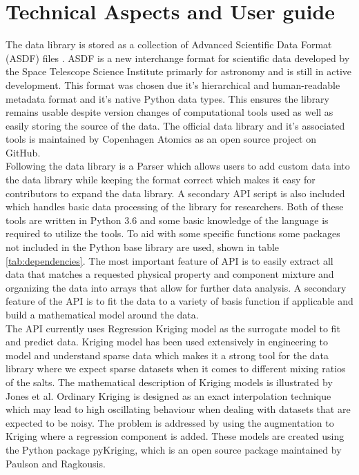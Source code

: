 \section{Technical Aspects and User guide}
The data library is stored as a collection of Advanced Scientific Data Format (ASDF) files \cite{greenfield2015a}. ASDF is a new interchange format for scientific data developed by the Space Telescope Science Institute primarly for astronomy and is still in active development. This format was chosen due it's hierarchical and human-readable metadata format and it's native Python data types. This ensures the library remains usable despite version changes of computational tools used as well as easily storing the source of the data. The official data library and it's associated tools is maintained by Copenhagen Atomics as an open source project on GitHub.\\ \newline
Following the data library is a Parser which allows users to add custom data into the data library while keeping the format correct which makes it easy for contributors to expand the data library. A secondary API script is also included which handles basic data processing of the library for researchers. Both of these tools are written in Python 3.6 and some basic knowledge of the language is required to utilize the tools. To aid with some specific functions some packages not included in the Python base library are used, shown in table \ref{tab:dependencies}. The most important feature of API is to easily extract all data that matches a requested physical property and component mixture and organizing the data into arrays that allow for further data analysis. A secondary feature of the API is to fit the data to a variety of basis function if applicable and build a mathematical model around the data.\\

The API currently uses Regression Kriging model as the surrogate model to fit and predict data. Kriging model has been used extensively in engineering to model and understand sparse data\cite{forrester2008a} which makes it a strong tool for the data library where we expect sparse datasets when it comes to different mixing ratios of the salts. The mathematical description of Kriging models is illustrated by Jones et al\cite{Jones2001}. Ordinary Kriging is designed as an exact interpolation technique which may lead to high oscillating behaviour when dealing with datasets that are expected to be noisy. The problem is addressed by using the augmentation to Kriging where a regression component is added\cite{HENGL20071301}. These models are created using the Python package pyKriging, which is an open source package maintained by Paulson and Ragkousis\cite{paulson_2015_21389}.

